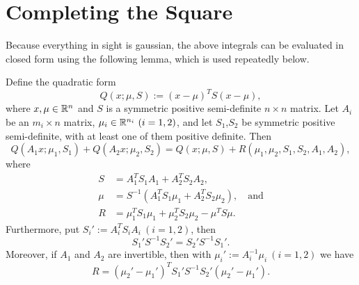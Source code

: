 \documentclass[12pt,leqno]{article}
\begin{document}
\section{Completing the Square} 
Because everything in sight is gaussian, the above integrals can be evaluated in closed form
using the following lemma, which is used repeatedly below.
\begin{Lem}
 Define the quadratic form
  $$
 Q(x;\mu,S) := (x-\mu)^TS(x-\mu),
  $$
  where $x,\mu\in {\mathbb R}^n$ and  $S$ is a symmetric positive semi-definite $n\times{n}$
  matrix. Let $A_i$ be an $m_i\times{n}$ matrix, $\mu_i\in{\mathbb R}^{n_i} ~ (i = 1,2)$,
  and let $S_1$,$S_2$ be symmetric positive semi-definite, with at least one of them
  positive definite.  Then 
\begin{equation}\label{comp_sq:1}
  Q(A_1x;\mu_1,S_1)+Q(A_2x;\mu_2,S_2) = Q(x;\mu,S) + R(\mu_1,\mu_2,S_1,S_2,A_1,A_2),
\end{equation}
where 
\begin{align}
S &= A_1^TS_1A_1 + A_2^TS_2A_2, \label{sigma}\\
\mu &= S^{-1}(A_1^TS_1\mu_1 + A_2^TS_2\mu_2),\quad\text{and}\label{mu}\\
R &= \mu_1^TS_1\mu_1 + \mu_2^TS_2\mu_2 - \mu^TS\mu. \label{R_def} 
\end{align}
Furthermore, put $S_i' := A_i^TS_iA_i ~ (i = 1,2)$, then
\begin{equation}\label{comp_sq:3}
  S_1'S^{-1}S_2' = S_2'S^{-1}S_1'.
\end{equation}
Moreover, if $A_1$ and $A_2$ are invertible, then with $\mu_i' := A_i^{-1}\mu_i ~ (i = 1,2)$ we have
\begin{equation}\label{comp_sq:R}
R = (\mu_2'-\mu_1')^TS_1'S^{-1}S_2'(\mu_2'-\mu_1').
\end{equation}
\end{Lem}
\end{document}
